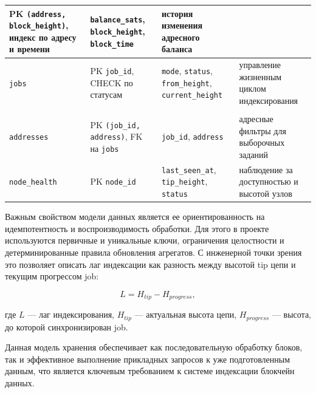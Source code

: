 \begin{scriptsize}
\begin{longtable}{|p{}|p{}|p{}|p{}|}
    PK \texttt{(address, block\_height)}, индекс по адресу и времени &
    \texttt{balance\_sats}, \texttt{block\_height}, \texttt{block\_time} &
    история изменения адресного баланса \\ \hline
    \texttt{jobs} &
    PK \texttt{job\_id}, CHECK по статусам &
    \texttt{mode}, \texttt{status}, \texttt{from\_height}, \texttt{current\_height} &
    управление жизненным циклом индексирования \\ \hline
    \shortstack[l]{\texttt{job}\\\texttt{addresses}} &
    PK \texttt{(job\_id, address)}, FK на \texttt{jobs} &
    \texttt{job\_id}, \texttt{address} &
    адресные фильтры для выборочных заданий \\ \hline
    \texttt{node\_health} &
    PK \texttt{node\_id} &
    \texttt{last\_seen\_at}, \texttt{tip\_height}, \texttt{status} &
    наблюдение за доступностью и высотой узлов \\ \hline
\end{longtable}
\end{scriptsize}

Важным свойством модели данных является ее ориентированность на
идемпотентность и воспроизводимость обработки. Для этого в проекте
используются первичные и уникальные ключи, ограничения целостности и
детерминированные правила обновления агрегатов. С инженерной точки зрения это
позволяет описать лаг индексации как
разность между высотой tip цепи и текущим прогрессом job:

\begin{equation}
    L = H_{tip} - H_{progress},
\end{equation}

где $L$ --- лаг индексирования, $H_{tip}$ --- актуальная высота цепи,
$H_{progress}$ --- высота, до которой синхронизирован job.

Данная модель хранения обеспечивает как последовательную обработку блоков, так
и эффективное выполнение прикладных запросов к уже подготовленным данным, что
является ключевым требованием к системе индексации блокчейн данных.
